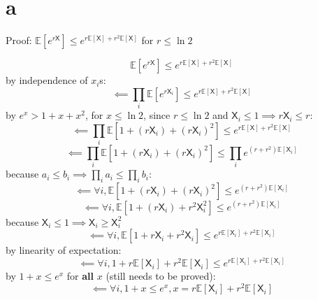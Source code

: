 \documentclass{article}
\newcommand{\E}{\mathbb{E}}
\newcommand{\rX}{\mathsf{X}}
\begin{document}
\section*{a}

Proof: $\E[e^{r\rX}] \leq e^{r\E[\rX] + r^2 \E[\rX]}$ for $r \leq \ln2$




$$\E[e^{r\rX}] \leq e^{r\E[\rX] + r^2 \E[\rX]}$$
by independence of $x_i$s:
$$\impliedby \prod_i \E[e^{r\rX_i}] \leq e^{r\E[\rX] + r^2 \E[\rX]}$$
by $e^x > 1 + x + x^2$, for $x \leq \ln2$, since $r \leq \ln2$ and $\rX_i \leq 1
\implies r\rX_i \leq r$:
$$\impliedby \prod_i \E[1+(r\rX_i) + (r\rX_i)^2] \leq e^{r\E[\rX] + r^2 \E[\rX]}$$
$$\impliedby \prod_i \E[1+(r\rX_i) + (r\rX_i)^2] \leq \prod_i e^{(r+r^2)\E[\rX_i]}$$
because $a_i \leq b_i \implies \prod_i a_i \leq \prod_i b_i$:
$$\impliedby \forall i, \E[1 + (r\rX_i) + (r\rX_i)^2] \leq e^{(r+r^2)\E[\rX_i]}$$
$$\impliedby \forall i, \E[1 + (r\rX_i) + r^2\rX_i^2] \leq e^{(r+r^2)\E[\rX_i]}$$
because $\rX_i \leq 1 \implies \rX_i \geq \rX_i^2$
$$\impliedby \forall i, \E[1 + r\rX_i + r^2\rX_i] \leq e^{r\E[\rX_i]+r^2\E[\rX_i]}$$
by linearity of expectation:
$$\impliedby \forall i, 1 + r\E[\rX_i] + r^2\E[\rX_i] \leq e^{r\E[\rX_i]+r^2\E[\rX_i]}$$
by $1 + x \leq e^x$ for \textbf{all} $x$ (still needs to be proved):
$$\impliedby \forall i, 1 + x \leq e^x, x = r\E[\rX_i] + r^2\E[\rX_i]$$
\end{document}
